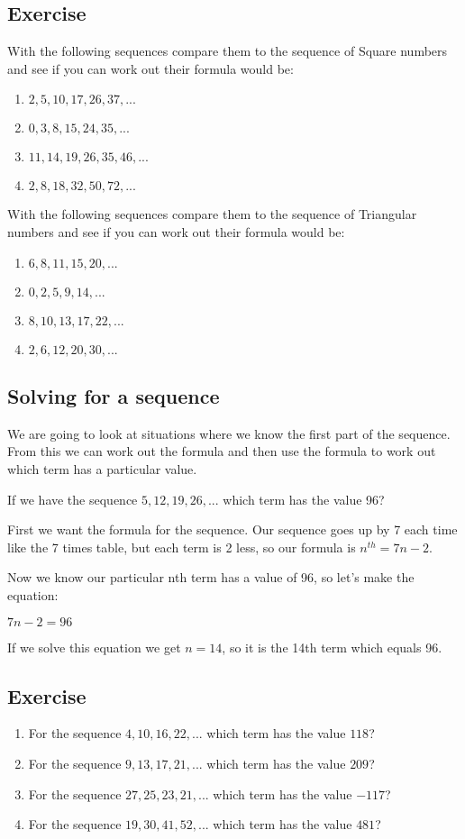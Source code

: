 \subsection{Exercise}
With the following sequences compare them to the sequence of Square numbers and see if you can work out their formula would be:
\begin{enumerate}
	\item $2,5,10,17,26,37,...$
	\item $0,3,8,15,24,35,...$
	\item $11,14,19,26,35,46,...$
	\item $2,8,18,32,50,72,...$
\end{enumerate}
With the following sequences compare them to the sequence of Triangular numbers and see if you can work out their formula would be:
\begin{enumerate}
	\item $6,8,11,15,20,...$
	\item $0,2,5,9,14,...$
	\item $8,10,13,17,22,...$
	\item $2,6,12,20,30,...$
\end{enumerate}

\subsection{Solving for a sequence}
We are going to look at situations where we know the first part of the sequence.  From this we can work out the formula and then use the formula to work out which term has a particular value.

\begin{exmp}
If we have the sequence $5, 12, 19, 26, ...$ which term has the value 96?

First we want the formula for the sequence.  Our sequence goes up by 7 each time like the 7 times table, but each term is 2 less, so our formula is $n^{th}=7n-2$.

Now we know our particular nth term has a value of 96, so let's make the equation:

$7n-2=96$

If we solve this equation we get $n=14$, so it is the 14th term which equals 96.
\end{exmp}

\subsection{Exercise}
\begin{enumerate}
	\item For the sequence $4,10,16,22,...$ which term has the value $118$?
	\item For the sequence $9,13,17,21,...$ which term has the value $209$?
	\item For the sequence $27, 25, 23, 21, ...$ which term has the value $-117$?
	\item For the sequence $19,30,41,52,...$ which term has the value $481$?
\end{enumerate}


